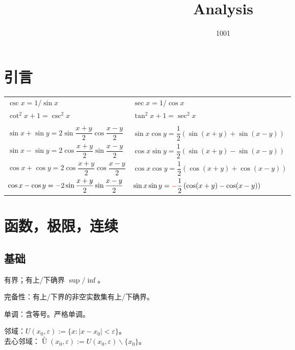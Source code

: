 \documentclass[12pt, a4paper, UTF8, openany]{ctexbook}
\title{Analysis}
\author{1001}
\newcommand{\uzero}{\mathop{U}\limits^{\circ}}%
\newcommand{\eps}{\varepsilon}
\begin{document}
    \maketitle

    \tableofcontents
    \cleardoublepage

    \chapter{引言}
    \begin{longtable}[2]{*{2}{w{l}{9cm}}}
        $\csc x = 1 / \sin x$ & $\sec x = 1 / \cos x$ \\
        $\cot^2 x + 1 = \csc^2 x$ & $\tan^2 x + 1 = \sec^2 x$ \\
        & \\
        $\sin x + \sin y = 2 \sin \dfrac{x + y}{2} \cos \dfrac{x - y}{2}$ & 
        $\sin x \cos y = \dfrac{1}{2}\left(\sin(x + y) + \sin(x - y)\right)$ \\
        \addlinespace
        $\sin x - \sin y = 2 \cos \dfrac{x + y}{2} \sin \dfrac{x - y}{2}$ & 
        $\cos x \sin y = \dfrac{1}{2}\left(\sin(x + y) - \sin(x - y)\right)$ \\
        \addlinespace
        $\cos x + \cos y = 2 \cos \dfrac{x + y}{2} \cos \dfrac{x - y}{2}$ &
        $\cos x \cos y = \dfrac{1}{2}\left(\cos(x + y) + \cos(x - y)\right)$ \\
        \addlinespace
        $\cos x - \cos y = {\color{red}-}2 \sin \dfrac{x + y}{2} \sin \dfrac{x - y}{2}$ &
        $\sin x \sin y = {\color{red}-}\dfrac{1}{2}\left(\cos(x + y) - \cos(x - y)\right)$
    \end{longtable}

    \chapter{函数，极限，连续}

    \section{基础}
    有界；有上/下确界 $\sup / \inf$。

    {\heiti 完备性}：有上/下界的非空实数集有上/下确界。

    单调：含等号。严格单调。

    邻域：$U(x_0, \eps) := \{x : |x - x_0| < \eps\}$。\\
    去心邻域：$\uzero(x_0, \eps) := U(x_0, \eps) \backslash \{x_0\}$。
    
\end{document}
